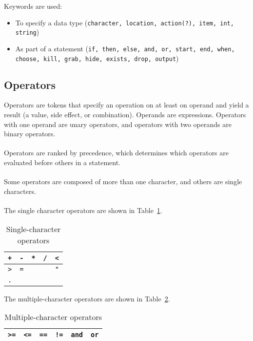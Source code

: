 \documentclass[12pt]{article}
\begin{document}
\noindent Keywords are used:
\begin{itemize}
\item To specify a data type (\texttt{character, location, action(?), item, int, string})
\item As part of a statement (\texttt{if, then, else, and, or, start, end, when, choose, kill, grab, hide, exists, drop, output}) 
\end{itemize}

\subsection{Operators}
Operators are tokens that specify an operation on at least on operand and yield a result (a value, side effect, or combination).  Operands are expressions.  Operators with one operand are unary operators, and operators with two operands are binary operators.
\\
\\
\noindent Operators are ranked by precedence, which determines which operators are evaluated before others in a statement.
\\
\\
\noindent Some operators are composed of more than one character, and others are single characters.
\\
\\
\noindent The single character operators are shown in Table~\ref{single_operators}.

\begin{table}[htdp]
\caption{Single-character operators}
\begin{center}
\begin{tabular}{|c|c|c|c|c|}
\hline
\texttt{+} & \texttt{-} & \texttt{*} & \texttt{/} & \texttt{<} \\
\hline
\texttt{>} & \texttt{=} & \texttt{} & \texttt{} & \texttt{"} \\
\hline
\texttt{.} & \texttt{} & \texttt{} & \texttt{} & \texttt{} \\
\hline
\end{tabular}
\end{center}
\label{single_operators}
\end{table}%


\noindent The multiple-character operators are shown in Table~\ref{multi_operators}.

\begin{table}[htdp]
\caption{Multiple-character operators}
\begin{center}
\begin{tabular}{|c|c|c|c|c|c|}
\hline
\texttt{>=} & \texttt{<=} & \texttt{==} & \texttt{!=} & \texttt{and} & \texttt{or} \\
\hline
\end{tabular}
\end{center}
\label{multi_operators}
\end{table}%
\end{document}
